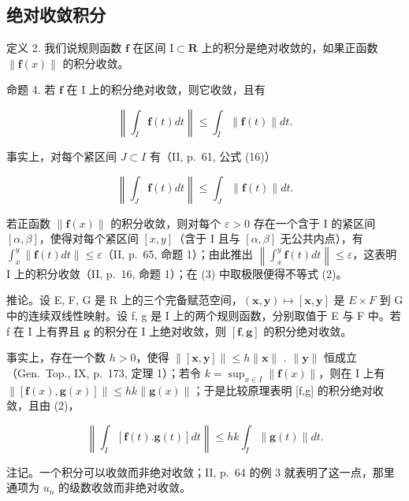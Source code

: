 \subsection{绝对收敛积分}

定义 2. 我们说规则函数 \(\mathbf{f}\) 在区间 \(\mathrm{I} \subset \mathbf{R}\) 上的积分是绝对收敛的，如果正函数 \(\| \mathbf{f}(x) \|\) 的积分收敛。

命题 4. 若 \(\mathbf{f}\) 在 \(\mathrm{I}\) 上的积分绝对收敛，则它收敛，且有

\[
\left\| \int_ {I} \mathbf {f} (t) d t \right\| \leqslant \int_ {I} \| \mathbf {f} (t) \| d t.\tag{2}
\]

事实上，对每个紧区间 \(J \subset I\) 有（II, p.~61, 公式 (16)）

\[
\left\| \int_ {J} \mathbf {f} (t) d t \right\| \leqslant \int_ {J} \| \mathbf {f} (t) \| d t.\tag{3}
\]

若正函数 \(\|\mathbf{f}(x)\|\) 的积分收敛，则对每个 \(\varepsilon > 0\) 存在一个含于 I 的紧区间 \([\alpha, \beta]\)，使得对每个紧区间 \([x, y]\)（含于 I 且与 \([\alpha, \beta]\) 无公共内点），有 \(\int_{x}^{y} \|\mathbf{f}(t) dt\| \leqslant \varepsilon\)（II, p.~65, 命题 1）；由此推出 \(\left\|\int_{x}^{y} \mathbf{f}(t) dt\right\| \leqslant \varepsilon\)，这表明 I 上的积分收敛（II, p.~16, 命题 1）；在 (3) 中取极限便得不等式 (2)。

推论。设 E, F, G 是 R 上的三个完备赋范空间，\((\mathbf{x}, \mathbf{y}) \mapsto [\mathbf{x}, \mathbf{y}]\) 是 \(E \times F\) 到 G 中的连续双线性映射。设 f, g 是 I 上的两个规则函数，分别取值于 E 与 F 中。若 f 在 I 上有界且 \(\mathbf{g}\) 的积分在 I 上绝对收敛，则 \([\mathbf{f},\mathbf{g}]\) 的积分绝对收敛。

事实上，存在一个数 \(h > 0\)，使得 \(\| [\mathbf{x},\mathbf{y}] \| \leqslant h \| \mathbf{x} \|\) . \(\| \mathbf{y} \|\) 恒成立（Gen.~Top., IX, p.~173, 定理 1）；若令 \(k = \sup_{x \in I} \| \mathbf{f}(x) \|\)，则在 I 上有 \(\| [\mathbf{f}(x),\mathbf{g}(x)] \| \leqslant hk \| \mathbf{g}(x) \|\)；于是比较原理表明 {[}f,g{]} 的积分绝对收敛，且由 (2)，

\[
\left\| \int_ {I} [ \mathbf {f} (t). \mathbf {g} (t) ] d t \right\| \leqslant h k \int_ {I} \| \mathbf {g} (t) \| d t.
\]

注记。一个积分可以收敛而非绝对收敛；II, p.~64 的例 3 就表明了这一点，那里通项为 \(u_{n}\) 的级数收敛而非绝对收敛。

